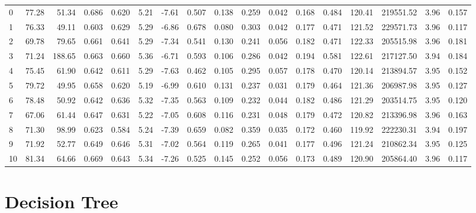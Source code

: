 \begin{itemize}
\begin{table}[ht]
\begin{adjustbox}{width=\textwidth}
\begin{tabular}{lrrrrrrrrrrrrrrrr}
        \midrule
        0  & 77.28 & 51.34 & 0.686 & 0.620 & 5.21 & -7.61 & 0.507 & 0.138 & 0.259 & 0.042 & 0.168 & 0.484 & 120.41 & 219551.52 & 3.96 & 0.157 \\
        1  & 76.33 & 49.11 & 0.603 & 0.629 & 5.29 & -6.86 & 0.678 & 0.080 & 0.303 & 0.042 & 0.177 & 0.471 & 121.52 & 229571.73 & 3.96 & 0.117 \\
        2  & 69.78 & 79.65 & 0.661 & 0.641 & 5.29 & -7.34 & 0.541 & 0.130 & 0.241 & 0.056 & 0.182 & 0.471 & 122.33 & 205515.98 & 3.96 & 0.181 \\
        3  & 71.24 & 188.65 & 0.663 & 0.660 & 5.36 & -6.71 & 0.593 & 0.106 & 0.286 & 0.042 & 0.194 & 0.581 & 122.61 & 217127.50 & 3.94 & 0.184 \\
        4  & 75.45 & 61.90 & 0.642 & 0.611 & 5.29 & -7.63 & 0.462 & 0.105 & 0.295 & 0.057 & 0.178 & 0.470 & 120.14 & 213894.57 & 3.95 & 0.152 \\
        5  & 79.72 & 49.95 & 0.658 & 0.620 & 5.19 & -6.99 & 0.610 & 0.131 & 0.237 & 0.031 & 0.179 & 0.464 & 121.36 & 206987.98 & 3.95 & 0.127 \\
        6  & 78.48 & 50.92 & 0.642 & 0.636 & 5.32 & -7.35 & 0.563 & 0.109 & 0.232 & 0.044 & 0.182 & 0.486 & 121.29 & 203514.75 & 3.95 & 0.120 \\
        7  & 67.06 & 61.44 & 0.647 & 0.631 & 5.22 & -7.05 & 0.608 & 0.116 & 0.231 & 0.048 & 0.179 & 0.472 & 120.82 & 213396.98 & 3.96 & 0.163 \\
        8  & 71.30 & 98.99 & 0.623 & 0.584 & 5.24 & -7.39 & 0.659 & 0.082 & 0.359 & 0.035 & 0.172 & 0.460 & 119.92 & 222230.31 & 3.94 & 0.197 \\
        9  & 71.92 & 52.77 & 0.649 & 0.646 & 5.31 & -7.02 & 0.564 & 0.119 & 0.265 & 0.041 & 0.177 & 0.496 & 121.24 & 210862.34 & 3.95 & 0.125 \\
        10 & 81.34 & 64.66 & 0.669 & 0.643 & 5.34 & -7.26 & 0.525 & 0.145 & 0.252 & 0.056 & 0.173 & 0.489 & 120.90 & 205864.40 & 3.96 & 0.117 \\
        \bottomrule
        \end{tabular}
        \end{adjustbox}
        \end{table}
\end{itemize} 







\section{Decision Tree}




